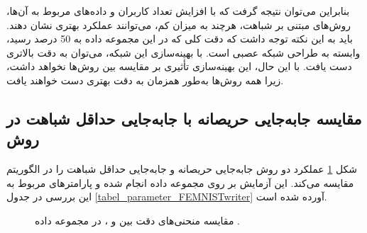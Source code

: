 بنابراین می‌توان نتیجه گرفت که با افزایش تعداد کاربران و داده‌های مربوط به آن‌ها، روش‌های مبتنی بر شباهت، هرچند به میزان کم، می‌توانند عملکرد بهتری نشان دهند.
باید به این نکته توجه داشت که دقت کلی که در این مجموعه داده به 50 درصد رسید، وابسته به طراحی شبکه عصبی است. با بهینه‌سازی این شبکه، می‌توان به دقت بالاتری دست یافت. با این حال، این بهینه‌سازی تأثیری بر مقایسه بین روش‌ها نخواهد داشت، زیرا همه روش‌ها به‌طور همزمان به دقت بهتری دست خواهند یافت.



\subsection{
	مقایسه جابه‌جایی حریصانه با جابه‌جایی حداقل شباهت در روش
}

شکل
\ref{result_MSS_vs_GS_FEMNISTwriter}
عملکرد دو روش جابه‌جایی حریصانه و جابه‌جایی حداقل شباهت را در الگوریتم
مقایسه می‌کند. این آزمایش بر روی مجموعه داده
انجام شده و پارامترهای مربوط به این بررسی در جدول
\ref{tabel_parameter_FEMNISTwriter}
آورده شده است.


\begin{figure}[t]
	\centering
	\hspace{0.8mm}
	\caption{
		مقایسه منحنی‌های دقت بین
		و
		، در مجموعه داده
		.
	}
	\label{result_MSS_vs_GS_FEMNISTwriter}
\end{figure}



